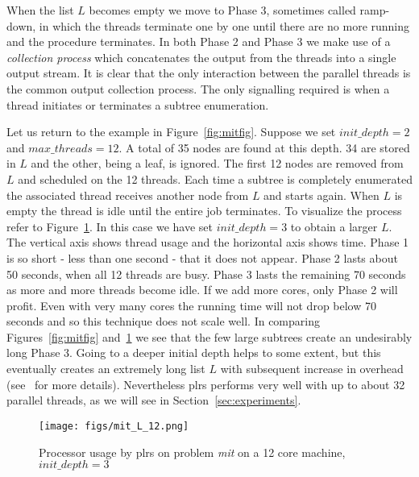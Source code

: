 \documentclass[a4paper,11pt]{article}   \usepackage{authblk} \usepackage[top=1.9cm,bottom=1.9cm,left=1.9cm,right=1.9cm]{geometry}
\newcommand{\progname}{\textsf}
\newcommand{\plrs}{\progname{plrs}\xspace}
\newcommand{\polytope}{\emph}
\newcommand{\mitine}{\polytope{mit}\xspace}
\newcommand{\initdepth}{\ensuremath{\mathit{init\_depth}}\xspace}
\newcommand{\maxthreads}{\ensuremath{\mathit{max\_threads}}\xspace}
\begin{document}
When the list $L$ becomes empty we move to Phase 3, sometimes called ramp-down,
in which the threads
terminate one by one until there are no more running and the procedure terminates.
In both Phase 2 and Phase 3 we make use of a \emph{collection process} which concatenates the output from the threads
into a single output stream.
It is clear that the only interaction between the parallel threads is the common output
collection process. The only signalling required is when a thread initiates or terminates
a subtree enumeration. 

Let us return to the example in Figure~\ref{fig:mitfig}.
Suppose we set $\initdepth=2$ and $\maxthreads=12$. 
A total of 35 nodes are found at this depth. 34 are stored in $L$ and the other, being a leaf, is ignored.
The first 12 nodes are removed from $L$ and scheduled on the 12 threads.
Each time a subtree is completely enumerated the associated thread receives
another node from $L$ and starts again. When $L$ is empty the thread is idle
until the entire job terminates.
To visualize the process refer to Figure~\ref{fig:mit_L_12}.
In this case we have set $\initdepth=3$ to obtain a larger $L$.
The vertical axis shows thread usage and the horizontal axis shows time.
Phase 1 is so short - less than one second - that it does not appear.
Phase 2 lasts about 50 seconds, when all 12 threads are busy.
Phase 3 lasts the remaining 70 seconds as more and more threads become idle.
If we add more cores, only Phase 2 will profit. Even with very many
cores the running time will not drop below 70 seconds and so this technique does not
scale well.
In comparing  Figures~\ref{fig:mitfig} and~\ref{fig:mit_L_12} we see that
the few large subtrees create an undesirably long Phase 3.
Going to a deeper initial depth helps to some extent, but this eventually 
creates an extremely long list $L$ with subsequent increase in overhead
(see~\cite{AR13} for more details). 
Nevertheless \plrs performs very well with up to about 32 parallel threads,
as we will see in Section~\ref{sec:experiments}.
\begin{figure}[htbp]
\centering
\texttt{[image: figs/mit\_L\_12.png]}
\caption{Processor usage by \plrs on problem \mitine on a 12 core machine, $\initdepth=3$}                          
\label{fig:mit_L_12}
\end{figure}     
\end{document}
